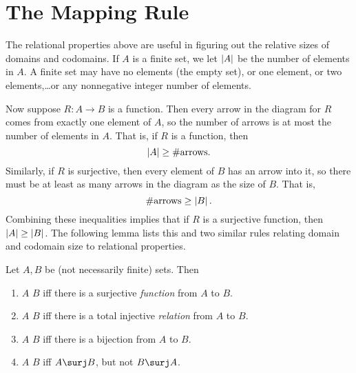 \section{The Mapping Rule}\label{mappingrule_sec}

The relational properties above are useful in figuring out the relative
sizes of domains and codomains.  If $A$ is a finite set, we let $\left|A\right|$
be the number of elements in $A$.  A finite set may have no elements (the
empty set), or one element, or two elements,\dots or any nonnegative
integer number of elements.

Now suppose $R:A \to B$ is a function.  Then every arrow in the diagram
for $R$ comes from exactly one element of $A$, so the number of arrows is
at most the number of elements in $A$.  That is, if $R$ is a function,
then
\[
\left|A\right| \geq \#\text{arrows}.
\]
Similarly, if $R$ is surjective, then every element of $B$ has an arrow
into it, so there must be at least as many arrows in the diagram as the
size of $B$.  That is,
\[
\#\text{arrows} \geq \left|B\right|.
\]
Combining these inequalities implies that if $R$ is a surjective function,
then $\left|A\right| \geq \left|B\right|$.  The following lemma lists this and two
similar rules relating domain and codomain size to relational properties.

\begin{definition}\label{bigger}
  Let $A,B$ be (not necessarily finite) sets.  Then
  \begin{enumerate}
  \item $A$ \term{$\surj$} $B$ iff there is a surjective \emph{function} from $A$ to $B$.  

  \item $A$ \term{$\inj$} $B$ iff there is a total injective \emph{relation} from $A$ to $B$.

  \item $A$ \term{$\bij$} $B$ iff there is a bijection from $A$ to $B$.  

  \item $A$ \term{$\strict$} $B$ iff $A \surj B$, but not $B \surj A$.  

  \end{enumerate}
\end{definition}

